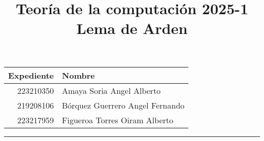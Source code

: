 \documentclass[a4paper, 12pt]{article}
\title{%
  Teoría de la computación 2025-1 \\
  Lema de Arden
}
\begin{document}
\maketitle

\begin{center}
    \begin{tabular}{r|l}
        \textbf{Expediente} & \textbf{Nombre} \\ \hline
        223210350 & Amaya Soria Angel Alberto \\
        219208106 & Bórquez Guerrero Angel Fernando \\
        223217959 & Figueroa Torres Oiram Alberto \\
    \end{tabular}
\end{center}

\rule{\linewidth}{0.3mm}
\end{document}
